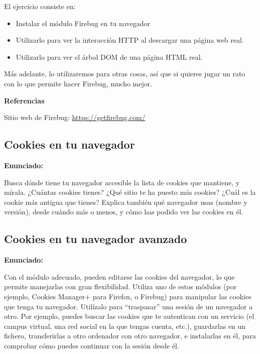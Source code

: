 El ejercicio consiste en:

\begin{itemize}
\item Instalar el módulo Firebug en tu navegador
\item Utilizarlo para ver la interacción HTTP al descargar una página web real.
\item Utilizarlo para ver el árbol DOM de una página HTML real.
\end{itemize}

Más adelante, lo utilizaremos para otras cosas, así que si quieres jugar un rato con lo que permite hacer Firebug, mucho mejor.

\textbf{Referencias}

Sitio web de Firebug: \url{https://getfirebug.com/}


\subsection{Cookies en tu navegador}
\label{subsec:cookies-navegador}

\textbf{Enunciado:}

Busca dónde tiene tu navegador accesible la lista de cookies que mantiene, y mírala. ¿Cuántas cookies tienes? ¿Qué sitio te ha puesto más cookies? ¿Cuál es la cookie más antigua que tienes? Explica también qué navegador usas (nombre y versión), desde cuándo más o menos, y cómo has podido ver las cookies en él.


\subsection{Cookies en tu navegador avanzado}
\label{subsec:cookies-navegador-2}

\textbf{Enunciado:}

Con el módulo adecuado, pueden editarse las cookies del navegador, lo que permite manejarlas con gran flexibilidad. Utiliza uno de estos módulos (por ejemplo, Cookies Manager$+$ para Firefox, o Firebug) para manipular las cookies que tenga tu navegador. Utilízalo para ``traspasar'' una sesión de un navegador a otro. Por ejemplo, puedes buscar las cookies que te autentican con un servicio (el campus virtual, una red social en la que tengas cuenta, etc.), guardarlas en un fichero, transferirlas a otro ordenador con otro navegador, e instalarlas en él, para comprobar cómo puedes continuar con la sesión desde él.

